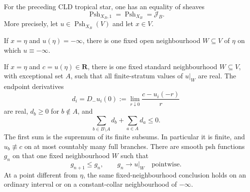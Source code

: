\begin{theorem}
\label{thm:p071-infinite-star-collapse-candidate}
For the preceding CLD tropical star, one has an equality of sheaves
\begin{equation}
 \operatorname{Psh}_{X_B,1}
   =\operatorname{Psh}_{X_B}
   =\mathscr J_B.
 \label{eq:p071-star-first-stage-collapse}
\end{equation}
More precisely, let \(u\in\operatorname{Psh}_{X_B}(V)\) and let
\(x\in V\).

If \(x=\eta\) and \(u(\eta)=-\infty\), there is one fixed open
neighbourhood \(W\subseteq V\) of \(\eta\) on which \(u\equiv-\infty\).

If \(x=\eta\) and \(c=u(\eta)\in\mathbf R\), there is one fixed standard
neighbourhood \(W\subseteq V\), with exceptional set \(A\), such that
all finite-stratum values of \(u|_W\) are real.  The endpoint derivatives
\begin{equation}
 d_i=D_-u_i(0)
     :=\lim_{r\downarrow0}\frac{c-u_i(-r)}{r}
 \label{eq:p071-star-endpoint-derivatives}
\end{equation}
are real, \(d_b\geq0\) for \(b\notin A\), and
\begin{equation}
 \sum_{b\in B\setminus A}d_b+\sum_{a\in A}d_a\leq0.
 \label{eq:p071-star-slope-balance}
\end{equation}
The first sum is the supremum of its finite subsums.  In particular it
is finite, and \(u_b\not\equiv c\) on at most countably many full
branches.  There are smooth psh functions \(g_n\) on that one fixed
neighbourhood \(W\) such that
\begin{equation}
                  g_{n+1}\leq g_n,
                  \qquad
                  g_n\longrightarrow u|_W
                  \quad\text{pointwise}.
 \label{eq:p071-star-fixed-neighbourhood-approximation}
\end{equation}
At a point different from \(\eta\), the same fixed-neighbourhood
conclusion holds on an ordinary interval or on a constant-collar
neighbourhood of \(-\infty\).
\end{theorem}
